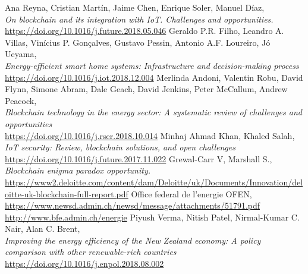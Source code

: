 \documentclass[11pt]{article}
\begin{document}
\begin{thebibliography}{25}
	Ana Reyna, Cristian Martín, Jaime Chen, Enrique Soler, Manuel Díaz, \\
	\textit{On blockchain and its integration with IoT. Challenges and opportunities.}\\
	\hyperref[https://doi.org/10.1016/j.future.2018.05.046]{https://doi.org/10.1016/j.future.2018.05.046}
	Geraldo P.R. Filho, Leandro A. Villas, Vinícius P. Gonçalves, Gustavo Pessin, Antonio A.F. Loureiro, Jó Ueyama, \\
	\textit{Energy-efficient smart home systems: Infrastructure
		and decision-making process}\\
	\hyperref[https://doi.org/10.1016/j.iot.2018.12.004]{https://doi.org/10.1016/j.iot.2018.12.004}
	Merlinda Andoni, Valentin Robu, David Flynn, Simone Abram, Dale Geach,  David Jenkins, Peter McCallum, Andrew Peacock,\\
	\textit{Blockchain technology in the energy sector: A systematic review of challenges and opportunities}\\
	\hyperref[https://doi.org/10.1016/j.rser.2018.10.014]{https://doi.org/10.1016/j.rser.2018.10.014}
	Minhaj Ahmad Khan, Khaled Salah, \\
	\textit{IoT security: Review, blockchain solutions, and open challenges}\\
	\hyperref[https://doi.org/10.1016/j.future.2017.11.022]{https://doi.org/10.1016/j.future.2017.11.022}
	Grewal-Carr V, Marshall S., \\
	\textit{Blockchain enigma paradox opportunity.}\\
	\hyperref[https://www2.deloitte.com/content/dam/Deloitte/uk/Documents/Innovation/deloitte-uk-blockchain-full-report.pdf]{https://www2.deloitte.com/content/dam/Deloitte/uk/Documents/Innovation/deloitte-uk-blockchain-full-report.pdf}
	Office federal de l'energie OFEN, \\
	\hyperref[https://www.newsd.admin.ch/newsd/message/attachments/51791.pdf]{https://www.newsd.admin.ch/newsd/message/attachments/51791.pdf}\\
	\hyperref[http://www.bfe.admin.ch/energie]{http://www.bfe.admin.ch/energie}
	Piyush Verma, Nitish Patel, Nirmal-Kumar C. Nair, Alan C. Brent, \\
	\textit{Improving the energy efficiency of the New Zealand economy: A policy comparison with other renewable-rich countries}\\
	\hyperref[https://doi.org/10.1016/j.enpol.2018.08.002]{https://doi.org/10.1016/j.enpol.2018.08.002}

\end{thebibliography}
\end{document}
